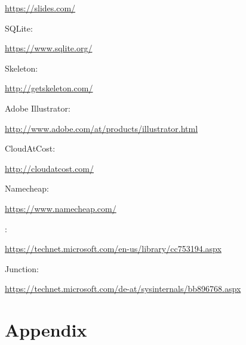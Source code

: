 \documentclass[12pt,a4paper,naustrian,english,oneside,openright,DIV=12,BCOR=1cm]{scrbook}
\begin{document}
\begin{thebibliography}{999}
	\url{https://slides.com/}
	
	 SQLite:
	
	\url{https://www.sqlite.org/}
	
	 Skeleton:
  
 	\url{http://getskeleton.com/}	
 	
 	 Adobe Illustrator:
  
 	\url{http://www.adobe.com/at/products/illustrator.html}
 	
 	 CloudAtCost:
  
 	\url{http://cloudatcost.com/}
 	
 	 Namecheap:
  
 	\url{https://www.namecheap.com/}
 	
	 :
	
	\url{https://technet.microsoft.com/en-us/library/cc753194.aspx}
	
	 Junction:
	
	\url{https://technet.microsoft.com/de-at/sysinternals/bb896768.aspx}

	
\end{thebibliography}

\appendix

\chapter{Appendix}
\end{document}
